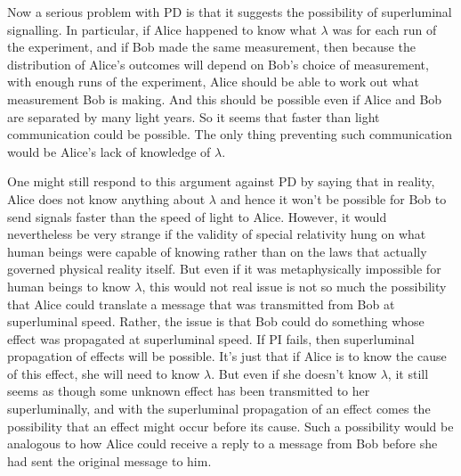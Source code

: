 Now a serious problem with PD is that it suggests the possibility of superluminal signalling. In particular, if Alice happened to know what $\lambda$ was for each run of the experiment, and if Bob made the same measurement, then because the distribution of Alice's outcomes will depend on Bob's choice of measurement, with enough runs of the experiment, Alice should be able to work out what measurement Bob is making. And this should be possible even if Alice and Bob are separated by many light years. So it seems that faster than light communication could be possible. The only thing preventing such communication would be Alice's lack of knowledge of $\lambda$. 

One might still respond to this argument against PD by saying that in reality, Alice does not know anything about $\lambda$ and hence it won't be possible for Bob to send signals faster than the speed of light to Alice. However, it would nevertheless be very strange if the validity of special relativity hung on what human beings were capable of knowing rather than on the laws that actually governed physical reality itself. But even if it was metaphysically impossible for human beings to know $\lambda$, this would not 
\newpage \noindent real issue is not so much the possibility that Alice could translate a message that was transmitted from Bob at superluminal speed. Rather, the issue is that Bob could do something whose effect was propagated at superluminal speed. If PI fails, then superluminal propagation of effects will be possible.\label{lambdaknowledge} It's just that if Alice is to know the cause of this effect, she will need to know $\lambda$. But even if she doesn't know $\lambda$, it still seems as though some unknown effect has been transmitted to her superluminally, and with the superluminal propagation of an effect comes the possibility that an effect might occur before its cause. Such a possibility would be analogous to how Alice could receive a reply to a message from Bob before she had sent the original message to him.